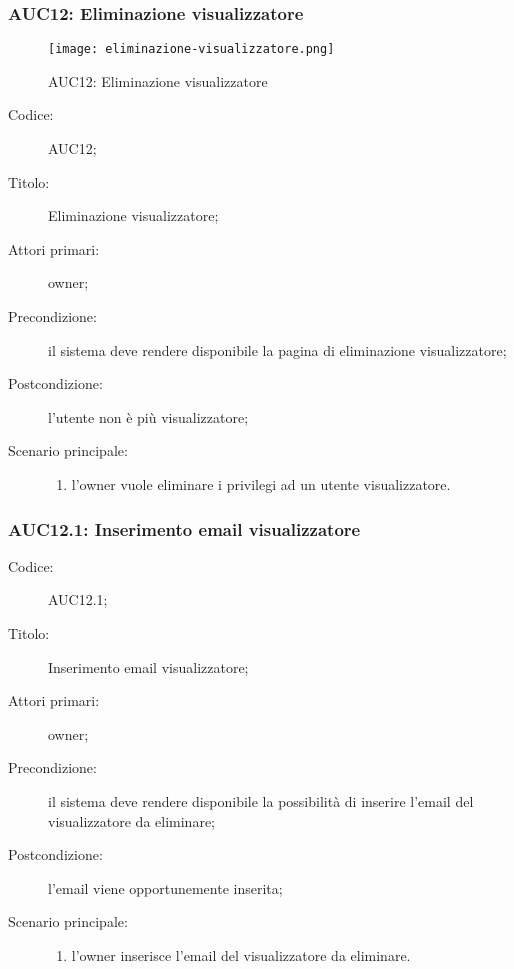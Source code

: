 \documentclass[../../../analisi-dei-requisiti.tex]{subfiles}
\begin{document}
\subsubsection{AUC12: Eliminazione visualizzatore}%
\label{subs:AUC12}

\begin{figure}[H]
  \centering
  \texttt{[image: eliminazione-visualizzatore.png]}
  \caption{AUC12: Eliminazione visualizzatore}%
  \label{fig:AUC12}
\end{figure}

\begin{description}
  \item[Codice:] AUC12;
  \item[Titolo:] Eliminazione visualizzatore;
  \item[Attori primari:] owner;
  \item[Precondizione:] il sistema deve rendere disponibile la pagina di eliminazione visualizzatore;
  \item[Postcondizione:] l'utente non è più visualizzatore;
  \item[Scenario principale:]
        \begin{enumerate}
          \item l'owner vuole eliminare i privilegi ad un utente visualizzatore.
        \end{enumerate}
\end{description}

\subsubsection{AUC12.1: Inserimento email visualizzatore}%
\label{subs:AUC12.1}
\begin{description}
  \item[Codice:] AUC12.1;
  \item[Titolo:] Inserimento email visualizzatore;
  \item[Attori primari:] owner;
  \item[Precondizione:] il sistema deve rendere disponibile la possibilità di inserire l'email del visualizzatore da eliminare;
  \item[Postcondizione:] l'email viene opportunemente inserita;
  \item[Scenario principale:]
        \begin{enumerate}
          \item l'owner inserisce l'email del visualizzatore da eliminare.
        \end{enumerate}
\end{description}
\end{document}
